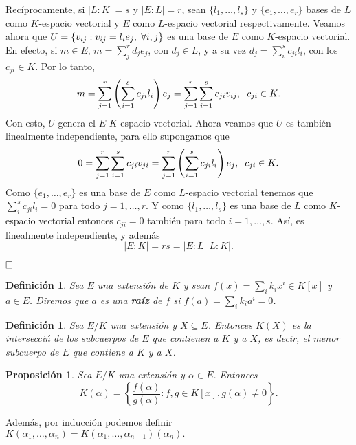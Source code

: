\documentclass[12pt]{article}
\newtheorem{proposition}[theorem]{Proposición}
\newtheorem{definition}[theorem]{Definición}
\begin{document}
Recíprocamente, si $|L:K| = s$ y $|E:L| = r$, sean $\lbrace l_{1}, \ldots, l_{s} \rbrace$ y $\lbrace e_{1}, \ldots, e_{r} \rbrace$ bases de $L$ como $K$-espacio vectorial y $E$ como $L$-espacio vectorial respectivamente. Veamos ahora que $U= \lbrace v_{ij} : v_{ij} = l_{i}e_{j}, \hspace{0.1cm} \forall i,j \rbrace$ es una base de $E$ como $K$-espacio vectorial. En efecto, si $m \in E$, $m = \sum_{j}^{r}d_{j}e_{j}$, con $d_{j} \in L$, y a su vez $d_{j} = \sum_{i}^{s}c_{ji}l_{i}$, con los $c_{ji} \in K$. Por lo tanto, $$m = \sum_{j=1}^{r} \left(\sum_{i=1}^{s} c_{ji}l_{i}\right) e_{j} = \sum_{j=1}^{r} \sum_{i=1}^{s}c_{ji}v_{ij}, \hspace{0.2cm} c_{ji} \in K.$$ Con esto, $U$ genera el $E$ $K$-espacio vectorial. Ahora veamos que $U$ es también linealmente independiente, para ello supongamos que $$0 = \sum_{j=1}^{r} \sum_{i=1}^{s} c_{ji}v_{ji} = \sum_{j=1}^{r}\left(\sum_{i=1}^{s} c_{ji}l_{i}\right) e_{j}, \hspace{0.2cm} c_{ji} \in K.$$ Como $\lbrace e_{1}, \ldots, e_{r} \rbrace$ es una base de $E$ como $L$-espacio vectorial tenemos que $\sum_{i}^{s} c_{ji}l_{i} = 0$ para todo $j=1, \ldots, r$. Y como $\lbrace l_{1}, \ldots, l_{s} \rbrace$ es una base de $L$ como $K$-espacio vectorial entonces $c_{ji} = 0$ también para todo $i = 1, \ldots, s$. Así, es linealmente independiente, y además $$|E:K| = rs = |E:L| |L:K|.$$

$\hfill \square$

\begin{definition}Sea $E$ una extensión de $K$ y sean $f(x) = \sum_ik_ix^i \in K[x]$ y $a \in E$. Diremos que $a$ es una \textbf{raíz} de $f$ si $f(a) = \sum_i k_i a^i = 0$.
\end{definition}

\begin{definition} Sea $E/K$ una extensión y $X\subseteq E$. Entonces $K(X)$ es la intersecciń de los subcuerpos de $E$ que contienen a $K$ y a $X$, es decir, el menor subcuerpo de $E$ que contiene a $K$ y a $X$.
\end{definition}

\begin{proposition} \label{eq:kalfa} Sea $E/K$ una extensión y $\alpha \in E$. Entonces $$K (\alpha) = \left\lbrace \dfrac{f(\alpha)}{g(\alpha)} : f,g \in K[x], g(\alpha) \neq 0 \right\rbrace.$$
\end{proposition}

Además, por inducción podemos definir $K(\alpha_{1}, \ldots, \alpha_{n} ) = K(\alpha_{1}, \ldots, \alpha_{n-1})(\alpha_{n}).$
\end{document}
